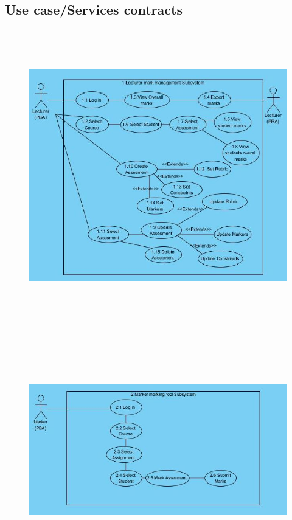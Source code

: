 \documentclass[12pt]{article}
\begin{document}
		\newpage
		\vspace{0.2in}
		
		\subsection{Use case/Services contracts}
		
			\vspace{0.2in}
			
			\begin{figure}[http]
				\centering
				\includegraphics[width=7in, height=5in]{./UML/LectureAPI.jpg}
			\end{figure}
			
			\begin{figure}[http]
				\centering
				\includegraphics[width=6in, height=4in]{./UML/MarkerAPI.jpg}
			\end{figure}
			
\end{document}
